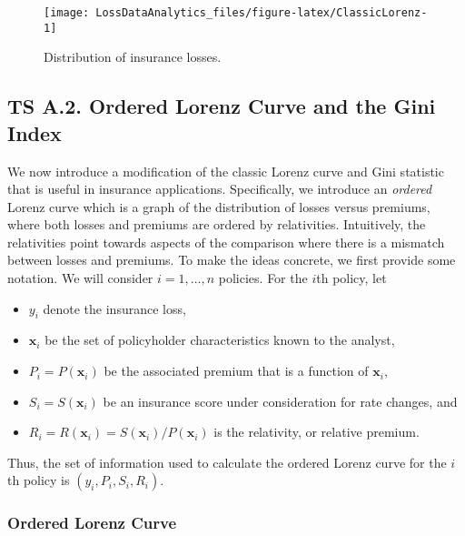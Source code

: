 \documentclass[]{book}
\providecommand{\tightlist}{%
  \setlength{\itemsep}{0pt}\setlength{\parskip}{0pt}}
\theoremstyle{definition}
\theoremstyle{definition}
\theoremstyle{definition}
\theoremstyle{remark}
\begin{document}
\begin{figure}

{\centering \texttt{[image: LossDataAnalytics\_files/figure-latex/ClassicLorenz-1]} 

}

\caption{Distribution of insurance losses.}\label{fig:ClassicLorenz}
\end{figure}

\subsection*{TS A.2. Ordered Lorenz Curve and the Gini
Index}\label{ts-a.2.-ordered-lorenz-curve-and-the-gini-index}

We now introduce a modification of the classic Lorenz curve and Gini
statistic that is useful in insurance applications. Specifically, we
introduce an \emph{ordered} Lorenz curve which is a graph of the
distribution of losses versus premiums, where both losses and premiums
are ordered by relativities. Intuitively, the relativities point towards
aspects of the comparison where there is a mismatch between losses and
premiums. To make the ideas concrete, we first provide some notation. We
will consider \(i=1, \ldots, n\) policies. For the \(i\)th policy, let

\begin{itemize}
\tightlist
\item
  \(y_i\) denote the insurance loss,
\item
  \(\mathbf{x}_i\) be the set of policyholder characteristics known to
  the analyst,
\item
  \(P_i=P(\mathbf{x}_i)\) be the associated premium that is a function
  of \(\mathbf{x}_i\),
\item
  \(S_i = S(\mathbf{x}_i)\) be an insurance score under consideration
  for rate changes, and
\item
  \(R_i = R(\mathbf{x}_i)=S(\mathbf{x}_i)/P(\mathbf{x}_i)\) is the
  relativity, or relative premium.
\end{itemize}

Thus, the set of information used to calculate the ordered Lorenz curve
for the \(i\)th policy is \((y_i, P_i, S_i, R_i)\).

\subsubsection*{Ordered Lorenz Curve}\label{ordered-lorenz-curve}
\end{document}
